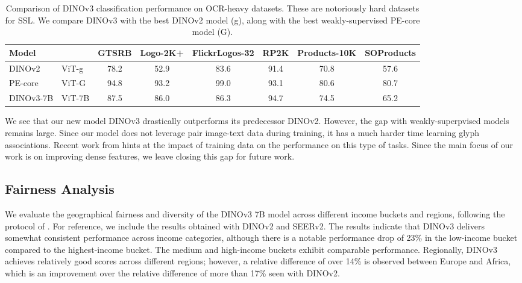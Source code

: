 \begin{table}[t]
    \centering
    \small
    \caption{
        Comparison of DINOv3 classification performance on OCR-heavy datasets.
        These are notoriously hard datasets for SSL.
        We compare DINOv3 with the best DINOv2 model (g), along with the best weakly-supervised PE-core model (G).
    }
    \label{tab:appendix:logos}
    \begin{tabular}{ll c cc ccc}
        \toprule
        Model && GTSRB & Logo-2K+ & FlickrLogos-32 & RP2K & Products-10K & SOProducts \\
        \midrule
        DINOv2 & ViT-g          & 78.2 & 52.9 & 83.6 & 91.4 & 70.8 & 57.6 \\
        PE-core & ViT-G              & 94.8 & 93.2 & 99.0 & 93.1 & 80.6 & 80.7 \\
        \midrule
        DINOv3-7B & ViT-7B         & 87.5 & 86.0 & 86.3 & 94.7 & 74.5 & 65.2 \\
        \bottomrule
    \end{tabular}
\end{table}

We see that our new model DINOv3 drastically outperforms its predecessor DINOv2.
However, the gap with weakly-superpvised models remains large.
Since our model does not leverage pair image-text data during training, it has a much harder time learning glyph associations.
Recent work from \citet{fan2025scaling} hints at the impact of training data on the performance on this type of tasks.
Since the main focus of our work is on improving dense features, we leave closing this gap for future work.

\subsection{Fairness Analysis}

We evaluate the geographical fairness and diversity of the DINOv3 7B model across different income buckets and regions, following the protocol of \citet{goyal2022fairness}.
For reference, we include the results obtained with DINOv2 and SEERv2. The results indicate that DINOv3 delivers somewhat consistent performance across income categories, although there is a notable performance drop of 23\% in the low-income bucket compared to the highest-income bucket. The medium and high-income buckets exhibit comparable performance. Regionally, DINOv3 achieves relatively good scores across different regions; however, a relative difference of over 14\% is observed between Europe and Africa, which is an improvement over the relative difference of more than 17\% seen with DINOv2.

